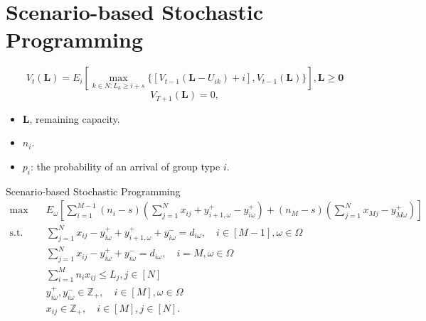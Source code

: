 
\section{Scenario-based Stochastic Programming}
    \frame{\sectionpage}

    \begin{frame}
        \centering
        $$V_{t}(\mathbf{L}) = E_{i} \left[ \max_{k \in N: L_k \geq i + s} \{ {[V_{t-1}(\mathbf{L}- U_{ik})+ i]}, {V_{t-1}(\mathbf{L})}\} \right], \mathbf{L} \geq \mathbf{0}$$
        $$V_{T+1}(\mathbf{L}) = 0,$$
    \end{frame}

    \begin{frame}
      \begin{itemize}
        \item $\mathbf{L}$, remaining capacity.
        \vspace{10pt}
        \item $n_i$.
        \vspace{10pt}
        \item $p_i$: the probability of an arrival of group type $i$.
      \end{itemize}
    \end{frame}

    \begin{frame}{Scenario-based Stochastic Programming}
      \small
      \begin{equation}\label{sto_form}
        \begin{aligned}
        \max \quad & E_{\omega}\left[\sum_{i=1}^{M-1} (n_i-s) (\sum_{j= 1}^{N} x_{ij} + y_{i+1,\omega}^{+} - y_{i \omega}^{+}) + (n_{M}-s) (\sum_{j= 1}^{N} x_{Mj} - y_{M \omega}^{+})\right] \\
        \text {s.t.} \quad & \sum_{j= 1}^{N} x_{ij}-y_{i \omega}^{+}+
        y_{i+1, \omega}^{+} + y_{i \omega}^{-}=d_{i \omega}, \quad i \in [M-1], \omega \in \Omega \\
        & \sum_{j= 1}^{N} x_{ij} -y_{i \omega}^{+}+y_{i \omega}^{-}=d_{i \omega}, \quad i = M, \omega \in \Omega \\
        & \sum_{i=1}^{M} n_{i} x_{ij} \leq L_j, j \in [N]\\
        & y_{i \omega}^{+}, y_{i \omega}^{-} \in \mathbb{Z}_{+}, \quad i \in [M], \omega \in \Omega \\
        & x_{ij} \in \mathbb{Z}_{+}, \quad i \in [M], j \in [N].
        \end{aligned}
      \end{equation}
    \end{frame}

